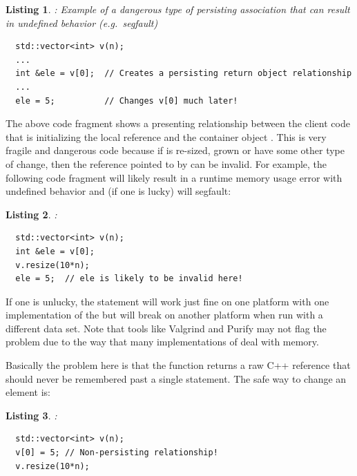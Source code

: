 \documentclass[pdf,ps2pdf,11pt]{SANDreport}
\newtheorem{listing}{Listing}
\begin{document}
{}\begin{listing}: Example of a dangerous type of persisting
association that can result in undefined behavior (e.g.\ segfault)
\label{listing:bad-perist-example}
{\small\begin{verbatim}
  std::vector<int> v(n);
  ...
  int &ele = v[0];  // Creates a persisting return object relationship
  ...
  ele = 5;          // Changes v[0] much later!
\end{verbatim}}
\end{listing}


The above code fragment shows a presenting relationship between the
client code that is initializing the local reference {} and
the {} container object {}.  This is very
fragile and dangerous code because if {} is re-sized, grown or
have some other type of change, then the reference pointed to by
{} can be invalid.  For example, the following code fragment
will likely result in a runtime memory usage error with undefined
behavior and (if one is lucky) will segfault:

\begin{listing}:\\
{\small\begin{verbatim}
  std::vector<int> v(n);
  int &ele = v[0];
  v.resize(10*n);
  ele = 5;  // ele is likely to be invalid here!
\end{verbatim}}
\end{listing}

If one is unlucky, the statement {} will work just fine on one
platform with one implementation of the {} but will break on
another platform when run with a different data set.  Note that tools like
Valgrind and Purify may not flag the problem due to the way that many
implementations of {} deal with memory.

Basically the problem here is that the
{} function returns a raw C++
reference that should never be remembered past a single statement.
The safe way to change an element is:

\begin{listing}:\\
{\small\begin{verbatim}
  std::vector<int> v(n);
  v[0] = 5; // Non-persisting relationship!
  v.resize(10*n);
\end{verbatim}}
\end{listing}
\end{document}

